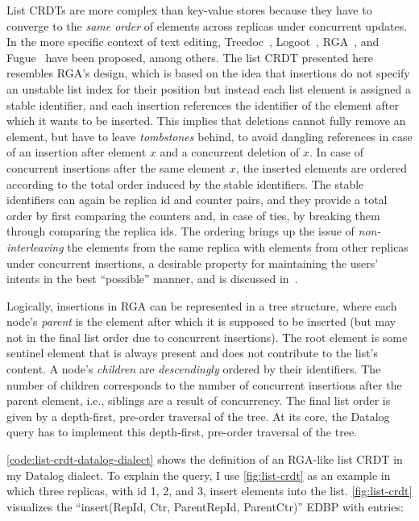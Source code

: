 List \acp{CRDT} are more complex than key-value stores because they have to
converge to the \emph{same order} of elements across replicas under concurrent
updates.
In the more specific context of text editing, Treedoc~\cite{treedoc},
Logoot~\cite{logoot}, RGA~\cite{rga}, and Fugue~\cite{fugue} have been proposed,
among others.
The list \ac{CRDT} presented here resembles RGA's design,
which is based on the idea that insertions do not specify an unstable list index
for their position but instead each list element is assigned a stable identifier,
and each insertion references the identifier of the element after which it wants
to be inserted.
This implies that deletions cannot fully remove an element, but have to leave
\emph{tombstones} behind, to avoid dangling references in case of an
insertion after element \(x\) and a concurrent deletion of \(x\).
In case of concurrent insertions after the same element \(x\),
the inserted elements are ordered according to the total order induced
by the stable identifiers.
The stable identifiers can again be replica id and counter pairs,
and they provide a total order by first comparing the counters and,
in case of ties, by breaking them through comparing the replica ids.
The ordering brings up the issue of \emph{non-interleaving} the elements from
the same replica with elements from other replicas under concurrent insertions,
a desirable property for maintaining the users' intents in the best
``possible'' manner, and is discussed in~\cite{fugue}.

Logically, insertions in RGA can be represented in a tree structure,
where each node's \emph{parent} is the element after which it is supposed to be
inserted (but may not in the final list order due to concurrent insertions).
The root element is some sentinel element that is always present and does not
contribute to the list's content.
A node's \emph{children} are \emph{descendingly} ordered by their identifiers.
The number of children corresponds to the number of concurrent insertions
after the parent element, i.e., siblings are a result of concurrency.
The final list order is given by a depth-first, pre-order traversal of the tree.
At its core, the Datalog query has to implement this depth-first, pre-order
traversal of the tree.



\ref{code:list-crdt-datalog-dialect} shows the definition of an RGA-like
list \ac{CRDT} in my Datalog dialect.
To explain the query, I use \ref{fig:list-crdt} as an example in which
three replicas, with id 1, 2, and 3, insert elements into the list.
\ref{fig:list-crdt} visualizes the ``insert(RepId, Ctr, ParentRepId, ParentCtr)''
\ac{EDBP} with entries:

